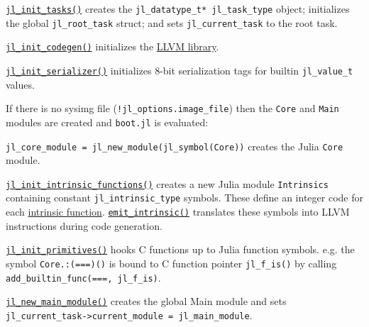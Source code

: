 \href{https://github.com/JuliaLang/julia/blob/master/src/task.c}{\texttt{jl\_init\_tasks()}} creates the \texttt{jl\_datatype\_t* jl\_task\_type} object; initializes the global \texttt{jl\_root\_task} struct; and sets \texttt{jl\_current\_task} to the root task.



\href{https://github.com/JuliaLang/julia/blob/master/src/codegen.cpp}{\texttt{jl\_init\_codegen()}} initializes the \href{http://llvm.org}{LLVM library}.



\href{https://github.com/JuliaLang/julia/blob/master/src/staticdata.c}{\texttt{jl\_init\_serializer()}} initializes 8-bit serialization tags for builtin \texttt{jl\_value\_t} values.



If there is no sysimg file (\texttt{!jl\_options.image\_file}) then the \texttt{Core} and \texttt{Main} modules are created and \texttt{boot.jl} is evaluated:



\texttt{jl\_core\_module = jl\_new\_module(jl\_symbol({\textquotedbl}Core{\textquotedbl}))} creates the Julia \texttt{Core} module.



\href{https://github.com/JuliaLang/julia/blob/master/src/intrinsics.cpp}{\texttt{jl\_init\_intrinsic\_functions()}} creates a new Julia module \texttt{Intrinsics} containing constant \texttt{jl\_intrinsic\_type} symbols. These define an integer code for each \href{https://github.com/JuliaLang/julia/blob/master/src/intrinsics.cpp}{intrinsic function}. \href{https://github.com/JuliaLang/julia/blob/master/src/intrinsics.cpp}{\texttt{emit\_intrinsic()}} translates these symbols into LLVM instructions during code generation.



\href{https://github.com/JuliaLang/julia/blob/master/src/builtins.c}{\texttt{jl\_init\_primitives()}} hooks C functions up to Julia function symbols. e.g. the symbol \texttt{Core.:(===)()} is bound to C function pointer \texttt{jl\_f\_is()} by calling \texttt{add\_builtin\_func({\textquotedbl}==={\textquotedbl}, jl\_f\_is)}.



\href{https://github.com/JuliaLang/julia/blob/master/src/toplevel.c}{\texttt{jl\_new\_main\_module()}} creates the global {\textquotedbl}Main{\textquotedbl} module and sets \texttt{jl\_current\_task->current\_module = jl\_main\_module}.




